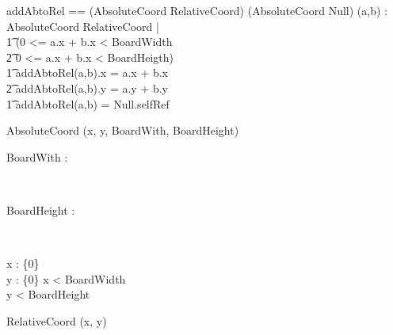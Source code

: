 \documentclass[12pt]{article}
\begin{document}
\begin{axdef}
addAbtoRel == (AbsoluteCoord \cross RelativeCoord) \rightarrow (AbsoluteCoord \union Null)
\where
\forall (a,b) : AbsoluteCoord \cross RelativeCoord | \\ \t1
\IF (0 <= a.x + b.x < BoardWidth \\ \t2
0 <= a.x + b.x < BoardHeigth) \\ \t1
\THEN
addAbtoRel(a,b).x = a.x + b.x \\ \t2
addAbtoRel(a,b).y = a.y + b.y \\ \t1
\ELSE addAbtoRel(a,b) = Null.selfRef
\end{axdef}

\begin{class}{AbsoluteCoord}
\upharpoonright (x, y, BoardWith, BoardHeight) \\
\begin{axdef}
BoardWith : \nat
\end{axdef} \\
\begin{axdef}
BoardHeight : \nat
\end{axdef} \\
\begin{state}
x : \nat \cup \{0\} \\
y : \nat \cup \{0\}
\where
x < BoardWidth \\
y < BoardHeight
\end{state}
\end{class}

\begin{class}{RelativeCoord}
\upharpoonright (x, y) \\
\end{class}
\end{document}
